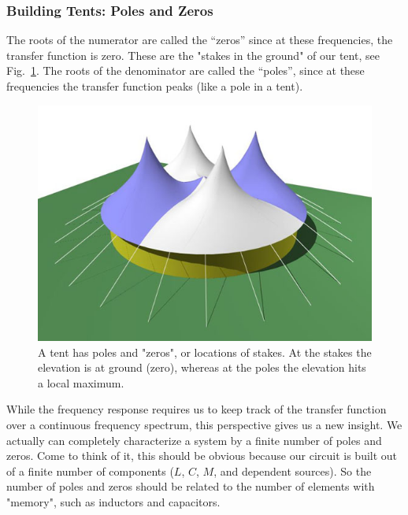 \subsubsection{Building Tents: Poles and Zeros}
The roots of the numerator are called the “zeros” since at these frequencies, the transfer function is zero.  These are the "stakes in the ground" of our tent, see Fig.~\ref{fig:tent}.  	The roots of the denominator are called the “poles”, since at these frequencies the transfer function peaks (like a pole in a tent).
\begin{figure}[tb]
\centering
\includegraphics[angle=-0.0,width=.8\columnwidth]{image_11.jpg}
\caption{A tent has poles and "zeros", or locations of stakes.  At the stakes the elevation is at ground (zero), whereas at the poles the elevation hits a local maximum.}
\label{fig:tent}
\end{figure}
While the frequency response requires us to keep track of the transfer function over a continuous frequency spectrum, this perspective gives us a new insight.  We actually can completely characterize a system by a finite number of poles and zeros.  Come to think of it, this should be obvious because our circuit is built out of a finite number of components ($L$, $C$, $M$, and dependent sources).  So the number of poles and zeros should be related to the number of elements with "memory", such as inductors and capacitors.  
